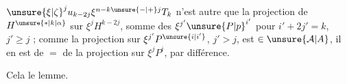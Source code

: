 $\unsure{\xi|\zeta}^{j}u_{k-2j}\xi^{n-k\unsure{-|+}j}T_k$ n'est autre que la
projection de $H^{\unsure{*|k|\alpha}}$ sur $\xi^j H^{k-2j}$, somme des
$\xi^{j'}\unsure{P|p}^{i'}$ pour $i'+2j'=k$, $j'\geq j$ ;  comme
la projection   sur $\xi^{j'}P^{\unsure{i|i'}}$,
$j'>j$, est $\in\unsure{\mathcal{A}|A}$, il en est de $=$ de
la projection sur $\xi^j P^i$, par différence.

Cela  le lemme.

